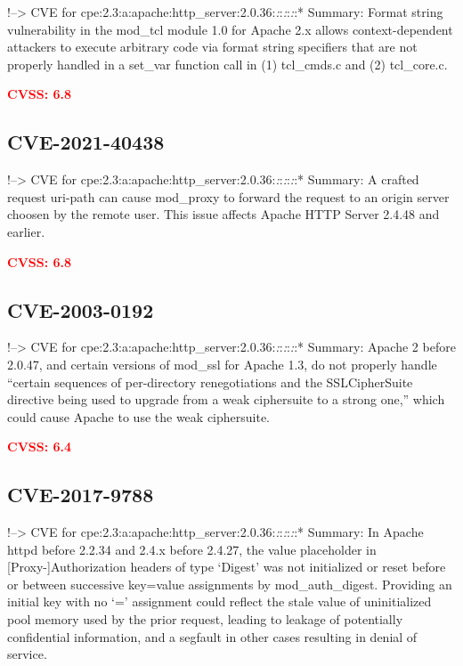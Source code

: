\documentclass[a4paper, 12pt]{article}
\begin{document}
!--\textgreater{} CVE for
cpe:2.3:a:apache:http\_server:2.0.36:\emph{:}:\emph{:}:\emph{:}:*
Summary: Format string vulnerability in the mod\_tcl module 1.0 for
Apache 2.x allows context-dependent attackers to execute arbitrary code
via format string specifiers that are not properly handled in a set\_var
function call in (1) tcl\_cmds.c and (2) tcl\_core.c.

\textbf{\textcolor{red}{CVSS: 6.8}}

\hypertarget{cve-2021-40438}{%
\subsection{CVE-2021-40438}\label{cve-2021-40438}}

!--\textgreater{} CVE for
cpe:2.3:a:apache:http\_server:2.0.36:\emph{:}:\emph{:}:\emph{:}:*
Summary: A crafted request uri-path can cause mod\_proxy to forward the
request to an origin server choosen by the remote user. This issue
affects Apache HTTP Server 2.4.48 and earlier.

\textbf{\textcolor{red}{CVSS: 6.8}}

\hypertarget{cve-2003-0192}{%
\subsection{CVE-2003-0192}\label{cve-2003-0192}}

!--\textgreater{} CVE for
cpe:2.3:a:apache:http\_server:2.0.36:\emph{:}:\emph{:}:\emph{:}:*
Summary: Apache 2 before 2.0.47, and certain versions of mod\_ssl for
Apache 1.3, do not properly handle ``certain sequences of per-directory
renegotiations and the SSLCipherSuite directive being used to upgrade
from a weak ciphersuite to a strong one,'' which could cause Apache to
use the weak ciphersuite.

\textbf{\textcolor{red}{CVSS: 6.4}}

\hypertarget{cve-2017-9788}{%
\subsection{CVE-2017-9788}\label{cve-2017-9788}}

!--\textgreater{} CVE for
cpe:2.3:a:apache:http\_server:2.0.36:\emph{:}:\emph{:}:\emph{:}:*
Summary: In Apache httpd before 2.2.34 and 2.4.x before 2.4.27, the
value placeholder in {[}Proxy-{]}Authorization headers of type `Digest'
was not initialized or reset before or between successive key=value
assignments by mod\_auth\_digest. Providing an initial key with no `='
assignment could reflect the stale value of uninitialized pool memory
used by the prior request, leading to leakage of potentially
confidential information, and a segfault in other cases resulting in
denial of service.
\end{document}
